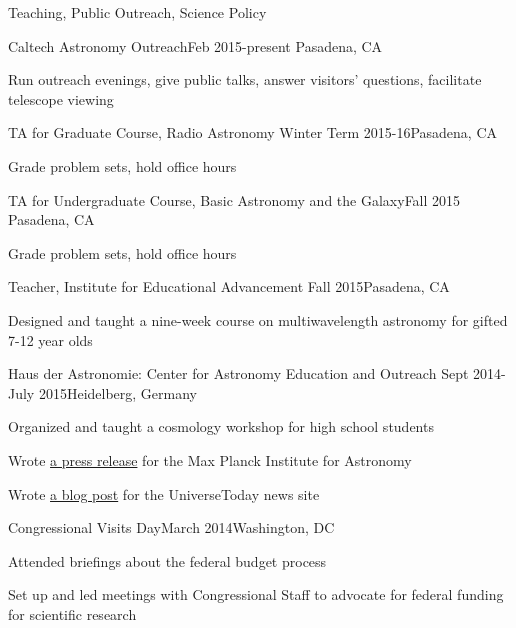 \documentclass{resume} %
\begin{document}
\begin{rSection}{Teaching, Public Outreach, Science Policy}

  \begin{rSubsection}{Caltech Astronomy Outreach}{Feb 2015-present}
    {}{Pasadena, CA}
  \item Run outreach evenings, give public talks, answer visitors' questions, 
    facilitate telescope viewing
  \end{rSubsection}

  \begin{rSubsection}{TA for Graduate Course, Radio Astronomy}
    {Winter Term 2015-16}{}{Pasadena, CA}
  \item Grade problem sets, hold office hours
  \end{rSubsection}

  \begin{rSubsection}
    {TA for Undergraduate Course, Basic Astronomy and the Galaxy}{Fall 2015}
    {}{Pasadena, CA}
  \item Grade problem sets, hold office hours
  \end{rSubsection}

  \begin{rSubsection}{Teacher, Institute for Educational Advancement}
    {Fall 2015}{}{Pasadena, CA}
  \item Designed and taught a nine-week course on multiwavelength astronomy
    for gifted 7-12 year olds
  \end{rSubsection}

  \begin{rSubsection}
    {Haus der Astronomie: Center for Astronomy Education and Outreach}
    {Sept 2014-July 2015}{}{Heidelberg, Germany}
  \item Organized and taught a cosmology workshop for high school students
  \item Wrote \href{http://www.mpia.de/news/science/2015-03-biosignatures}
    {a press release} for the Max Planck Institute for Astronomy
  \item Wrote \href{http://www.universetoday.com/120820/distant-stellar-nurseries-this-time-in-high-definition/}
    {a blog post} for the UniverseToday news site

  \end{rSubsection}

\begin{rSubsection}{Congressional Visits Day}{March 2014}{}{Washington, DC}
\item Attended briefings about the federal budget process
\item Set up and led meetings with Congressional Staff to advocate 
  for federal funding for scientific research
\end{rSubsection}


\end{rSection}
\end{document}
